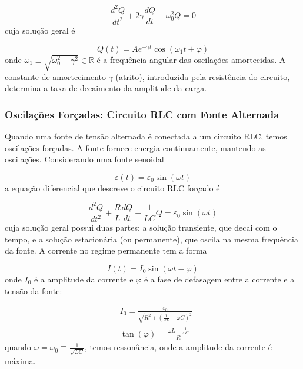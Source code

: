 \documentclass{article}
\begin{document}
\begin{equation}
    \frac{d^2Q}{dt^2} + 2\gamma \frac{dQ}{dt} + \omega_0^2 Q = 0
\end{equation} cuja solução geral é

\begin{equation}\label{eq:solucao_oscilador_amortecido}
    \boxed{Q(t) = A e^{-\gamma t} \cos(\omega_1 t + \varphi)}
\end{equation} onde \(\displaystyle \omega_1 \equiv \sqrt{\omega_0^2 - \gamma^2}\in\mathbb{R}\) é a frequência angular das oscilações amortecidas. A constante de amortecimento \(\gamma\) (atrito), introduzida pela resistência do circuito, determina a taxa de decaimento da amplitude da carga.

\subsubsection{Oscilações Forçadas: Circuito RLC com Fonte Alternada}

Quando uma fonte de tensão alternada é conectada a um circuito RLC, temos oscilações forçadas. A fonte fornece energia continuamente, mantendo as oscilações. Considerando uma fonte senoidal

\begin{equation}
    \varepsilon(t) = \varepsilon_0 \sin(\omega t)
\end{equation} a equação diferencial que descreve o circuito RLC forçado é

\begin{equation}
    \frac{d^2Q}{dt^2} + \frac{R}{L} \frac{dQ}{dt} + \frac{1}{LC} Q = \varepsilon_0 \sin(\omega t)
\end{equation} cuja solução geral possui duas partes: a solução transiente, que decai com o tempo, e a solução estacionária (ou permanente), que oscila na mesma frequência da fonte. A corrente no regime permanente tem a forma

\begin{equation}
    \boxed{I(t) = I_0 \sin(\omega t - \varphi)}
\end{equation} onde \(I_0\) é a amplitude da corrente e \(\varphi\) é a fase de defasagem entre a corrente e a tensão da fonte:

\begin{align}
    &I_0 = \frac{\varepsilon_0}{\sqrt{R^2 + \left(\frac{1}{\omega L} - \omega C\right)^2}} \\
    &\tan(\varphi) = \frac{\omega L - \frac{1}{\omega C}}{R}
\end{align} quando \(\displaystyle \omega = \omega_0 \equiv \frac{1}{\sqrt{LC}}\), temos ressonância, onde a amplitude da corrente é máxima.
\end{document}
